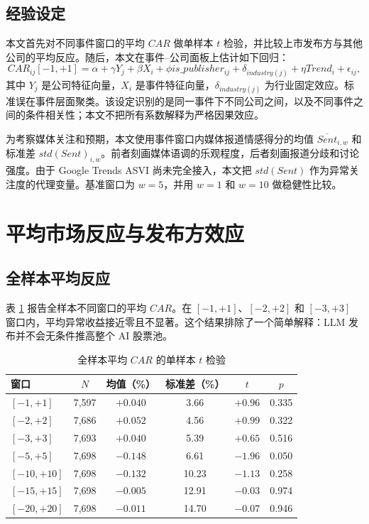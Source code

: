 \documentclass[11pt,fontset=fandol]{ctexart}
\begin{document}
\subsection{经验设定}

本文首先对不同事件窗口的平均 $CAR$ 做单样本 $t$ 检验，并比较上市发布方与其他公司的平均反应。随后，本文在事件--公司面板上估计如下回归：
\begin{equation}
CAR_{ij}[-1,+1] =
\alpha
+ \gamma Y_j
+ \beta X_i
+ \phi is\_publisher_{ij}
+ \delta_{industry(j)}
+ \eta Trend_i
+ \epsilon_{ij},
\label{eq:main}
\end{equation}
其中 $Y_j$ 是公司特征向量，$X_i$ 是事件特征向量，$\delta_{industry(j)}$ 为行业固定效应。标准误在事件层面聚类。该设定识别的是同一事件下不同公司之间，以及不同事件之间的条件相关性；本文不把所有系数解释为严格因果效应。

为考察媒体关注和预期，本文使用事件窗口内媒体报道情感得分的均值 $\overline{Sent}_{i,w}$ 和标准差 $std(Sent)_{i,w}$。前者刻画媒体语调的乐观程度，后者刻画报道分歧和讨论强度。由于 Google Trends ASVI 尚未完全接入，本文把 $std(Sent)$ 作为异常关注度的代理变量。基准窗口为 $w=5$，并用 $w=1$ 和 $w=10$ 做稳健性比较。

\section{平均市场反应与发布方效应}
\label{sec:event}

\subsection{全样本平均反应}

表 \ref{tab:car_tt} 报告全样本不同窗口的平均 $CAR$。在 $[-1,+1]$、$[-2,+2]$ 和 $[-3,+3]$ 窗口内，平均异常收益接近零且不显著。这个结果排除了一个简单解释：LLM 发布并不会无条件推高整个 AI 股票池。

\begin{table}[htbp]
\centering
\caption{全样本平均 $CAR$ 的单样本 $t$ 检验}
\label{tab:car_tt}
\small
\begin{tabular}{lccccc}
\toprule
窗口 & $N$ & 均值（\%） & 标准差（\%） & $t$ & $p$ \\
\midrule
$[-1,+1]$   & 7{,}597 & $+0.040$ & 3.66 & $+0.96$ & 0.335 \\
$[-2,+2]$   & 7{,}686 & $+0.052$ & 4.56 & $+0.99$ & 0.322 \\
$[-3,+3]$   & 7{,}693 & $+0.040$ & 5.39 & $+0.65$ & 0.516 \\
$[-5,+5]$   & 7{,}698 & $-0.148$ & 6.61 & $-1.96$ & 0.050 \\
$[-10,+10]$ & 7{,}698 & $-0.132$ & 10.23 & $-1.13$ & 0.258 \\
$[-15,+15]$ & 7{,}698 & $-0.005$ & 12.91 & $-0.03$ & 0.974 \\
$[-20,+20]$ & 7{,}698 & $-0.011$ & 14.70 & $-0.07$ & 0.946 \\
\bottomrule
\end{tabular}
\end{table}
\end{document}
